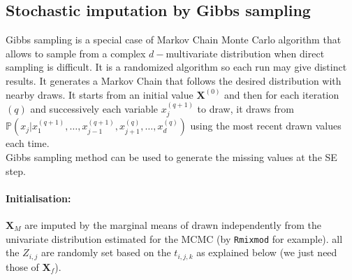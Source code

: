 \documentclass[12pt,a4paper]{report}
\begin{document}
	\subsection{Stochastic imputation by Gibbs sampling}
		Gibbs sampling \cite{casella1992explaining} is a special case of Markov Chain Monte Carlo algorithm \cite{gilks1996markov,chib1995understanding,roberts2001optimal} that allows to sample from a complex $d-$multivariate distribution when direct sampling is difficult. It is a randomized algorithm so each run may give distinct results. It generates a Markov Chain that follows the desired distribution with nearby draws. It starts from an initial value $\boldsymbol{X}^{(0)}$ and then for each iteration $(q)$ and successively each variable $x_j^{(q+1)}$ to draw, it draws from $\mathbb{P}(x_j|x_1^{(q+1)}, \dots,x_{j-1}^{(q+1)},x_{j+1}^{(q)},\dots,x_d^{(q)})$ using the most recent drawn values each time. \\
		
		Gibbs sampling method can be used to generate the missing values at the SE step. 
		\paragraph{Initialisation:}  %
		$\boldsymbol{X}_M$ are imputed by the marginal means of drawn independently from the univariate distribution estimated for the MCMC (by {\tt Rmixmod} for example). all the $Z_{i,j}$ are randomly set based on the $t_{i,j,k}$ as explained below (we just need those of $\boldsymbol{X}_f$). 
\end{document}
